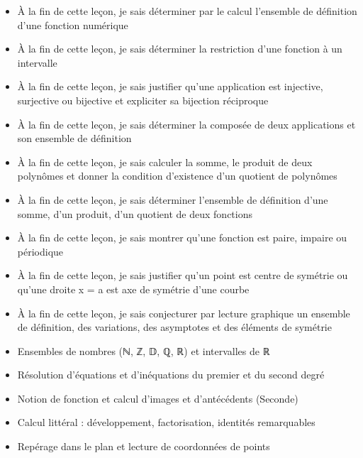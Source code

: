 \documentclass[11pt]{article}
\begin{document}
\begin{objectifs}
\begin{itemize}
\item À la fin de cette leçon, je sais déterminer par le calcul l'ensemble de définition d'une fonction numérique
\item À la fin de cette leçon, je sais déterminer la restriction d'une fonction à un intervalle
\item À la fin de cette leçon, je sais justifier qu'une application est injective, surjective ou bijective et expliciter sa bijection réciproque
\item À la fin de cette leçon, je sais déterminer la composée de deux applications et son ensemble de définition
\item À la fin de cette leçon, je sais calculer la somme, le produit de deux polynômes et donner la condition d'existence d'un quotient de polynômes
\item À la fin de cette leçon, je sais déterminer l'ensemble de définition d'une somme, d'un produit, d'un quotient de deux fonctions
\item À la fin de cette leçon, je sais montrer qu'une fonction est paire, impaire ou périodique
\item À la fin de cette leçon, je sais justifier qu'un point est centre de symétrie ou qu'une droite x = a est axe de symétrie d'une courbe
\item À la fin de cette leçon, je sais conjecturer par lecture graphique un ensemble de définition, des variations, des asymptotes et des éléments de symétrie
\end{itemize}
\end{objectifs}

\begin{prerequis}
\begin{itemize}
\item Ensembles de nombres (ℕ, ℤ, 𝔻, ℚ, ℝ) et intervalles de ℝ
\item Résolution d'équations et d'inéquations du premier et du second degré
\item Notion de fonction et calcul d'images et d'antécédents (Seconde)
\item Calcul littéral : développement, factorisation, identités remarquables
\item Repérage dans le plan et lecture de coordonnées de points
\end{itemize}
\end{prerequis}

\newpage
\end{document}
